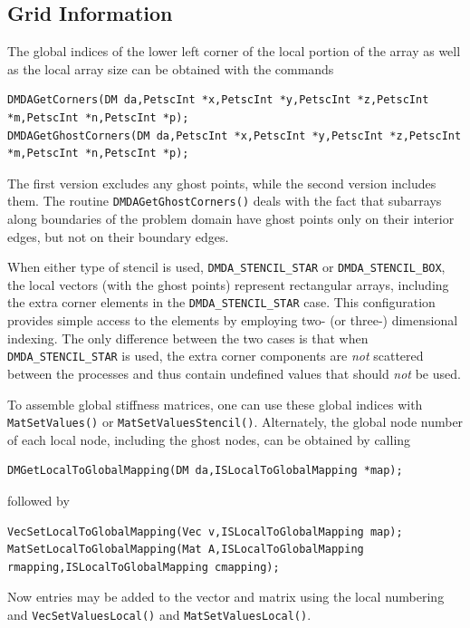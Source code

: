 \subsection{Grid Information}

The global indices of the lower left corner of the local portion of the array
as well as the local array size can be obtained with the commands
\begin{lstlisting}
DMDAGetCorners(DM da,PetscInt *x,PetscInt *y,PetscInt *z,PetscInt *m,PetscInt *n,PetscInt *p);
DMDAGetGhostCorners(DM da,PetscInt *x,PetscInt *y,PetscInt *z,PetscInt *m,PetscInt *n,PetscInt *p);
\end{lstlisting}
The first version excludes any ghost points, while the second version
includes them.
The routine \lstinline{DMDAGetGhostCorners()}
deals with the fact that subarrays along boundaries of the problem
domain have ghost points only on their interior edges, but not on
their boundary edges.

When either type of stencil is used, \lstinline{DMDA_STENCIL_STAR} or
\lstinline{DMDA_STENCIL_BOX}, the local vectors (with the ghost points)
represent rectangular arrays, including the extra corner elements in
the \lstinline{DMDA_STENCIL_STAR} case. This configuration provides simple
access to the elements by employing two- (or three-) dimensional indexing.
The only difference between the
two cases is that when \lstinline{DMDA_STENCIL_STAR} is used, the extra
corner components are {\em not} scattered between the processes and thus
contain undefined values that should {\em not} be used.

To assemble global stiffness matrices, one can use these global indices with \lstinline{MatSetValues()}
or \lstinline{MatSetValuesStencil()}.
Alternately, the global node number of each local node,
including the ghost nodes, can be obtained by calling
\begin{lstlisting}
DMGetLocalToGlobalMapping(DM da,ISLocalToGlobalMapping *map);
\end{lstlisting}
followed by
\begin{lstlisting}
VecSetLocalToGlobalMapping(Vec v,ISLocalToGlobalMapping map);
MatSetLocalToGlobalMapping(Mat A,ISLocalToGlobalMapping rmapping,ISLocalToGlobalMapping cmapping);
\end{lstlisting}
Now entries may be added to the vector and matrix using the local numbering
and \break\lstinline{VecSetValuesLocal()} and \lstinline{MatSetValuesLocal()}.


